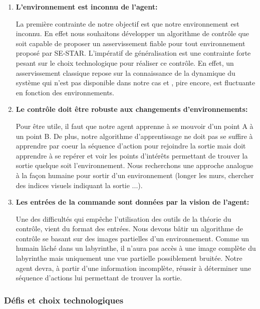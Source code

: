 \begin{enumerate}
    \item \textbf{L'environnement est inconnu de l'agent:}
    \smallskip
    
    La première contrainte de notre objectif est que notre environnement est inconnu. En effet nous souhaitons développer un algorithme de contrôle que soit capable de proposer un asservissement fiable pour tout environnement proposé par SE-STAR. L'impératif de généralisation est une contrainte forte pesant sur le choix technologique pour réaliser ce contrôle. En effet, un asservissement classique repose sur la connaissance de la dynamique du système qui n'est pas disponible dans notre cas et , pire encore, est fluctuante en fonction des environnements.
    
    \item \textbf{Le contrôle doit être robuste aux changements d'environnements:}
    \smallskip
    
    Pour être utile, il faut que notre agent apprenne à se mouvoir d'un point A à un point B. De plus, notre algorithme d'apprentissage ne doit pas se suffire à apprendre par coeur la séquence d'action pour rejoindre la sortie mais doit apprendre à se repérer et voir les points d'intérêts permettant de trouver la sortie quelque soit l'environnement. Nous recherchons une approche analogue à la façon humaine  pour sortir d'un environnement (longer les murs, chercher des indices visuels indiquant la sortie ...).
 
    \item \textbf{Les entrées de la commande sont données par la vision de l'agent:}
    \smallskip
    
    Une des difficultés qui empêche l'utilisation des outils de la théorie du contrôle, vient du format des entrées. Nous devons bâtir un algorithme de contrôle se basant sur des images partielles d'un environnement. Comme un humain lâché dans un labyrinthe, il n'aura pas accès à une image complète du labyrinthe mais uniquement une vue partielle possiblement bruitée. Notre agent devra, à partir d'une information incomplète, réussir à déterminer une séquence d'actions lui permettant de trouver la sortie.
    
  
\end{enumerate}

\subsubsection{Défis et choix technologiques}

